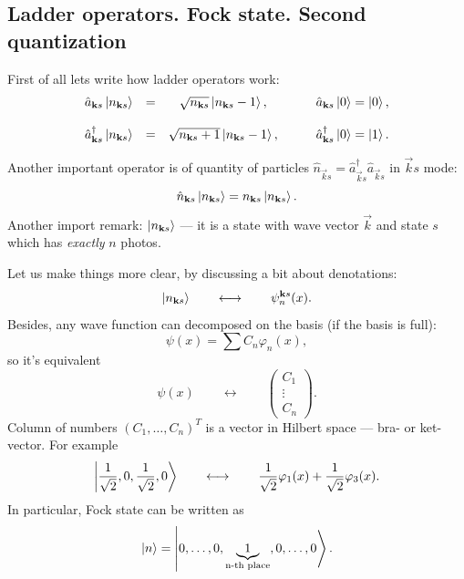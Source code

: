	
	\subsection{Ladder operators. Fock state. Second quantization}
	
	First of all lets write how ladder operators work:
	\begin{equation}
		\begin{matrix}
			\hat{a}_{\mathbf{k}s} \left\lvert {n_{\mathbf{k}s}} \right\rangle &=& \sqrt{n_{\mathbf{k}s}} \left\lvert {n_{\mathbf{k}s}-1} \right\rangle, & \quad & \hat{a}_{\mathbf{k}s} \left\lvert {0} \right\rangle = \left\lvert {0} \right\rangle, \\ \\
			\hat{a}^{\dagger}_{\mathbf{k}s} \left\lvert {n_{\mathbf{k}s}} \right\rangle &=& \sqrt{n_{\mathbf{k}s}+1} \left\lvert {n_{\mathbf{k}s}-1} \right\rangle, & \quad & \hat{a}^{\dagger}_{\mathbf{k}s} \left\lvert {0} \right\rangle = \left\lvert {1} \right\rangle.
		\end{matrix}
	\end{equation}
	
	Another important operator is of quantity of particles $\hat{n}_{\vec{k}s} = \hat{a}^{\dagger}_{\vec{k}s} \hat{a}_{\vec{k}s}$ in $\vec{k}s$ mode:
	\begin{equation}
		\hat{n}_{\mathbf{k}s} \left\lvert {n_{\mathbf{k}s}} \right\rangle = n_{\mathbf{k}s} \left\lvert {n_{\mathbf{k}s}} \right\rangle.
	\end{equation}
	Another import remark: $\left\lvert {n_{\mathbf{k}s}} \right\rangle$ --- it is a state with wave vector $\vec{k}$ and state $s$ which has \textit{exactly} $n$ photos.
	
	
	Let us make things more clear, by discussing a bit about denotations:
	\begin{equation}
		\left\lvert {n_{\mathbf{k}s}} \right\rangle \qquad \longleftrightarrow \qquad \psi_n^{\mathbf{k}s} (x).
	\end{equation}
	Besides, any wave function can decomposed
	on the basis (if the basis is full):
	\begin{equation}
		\psi(x) = \sum C_n \varphi_n(x),
	\end{equation}
	so it's equivalent
	\begin{equation}
		\psi(x) \qquad \longleftrightarrow \qquad \left( \begin{matrix}
			C_1 \\
			\vdots \\
			C_n
		\end{matrix} \right).
	\end{equation}
	Column of numbers $\left(C_1, \dots , C_n\right)^T$ is a vector in Hilbert space --- bra- or ket-vector. For example
	\begin{equation}
		\left\lvert {\frac{1}{\sqrt{2}},0,\frac{1}{\sqrt{2}},0} \right\rangle \qquad \longleftrightarrow \qquad \frac{1}{\sqrt{2}} \varphi_1(x) + \frac{1}{\sqrt{2}} \varphi_3(x).
	\end{equation}
	In particular, Fock state can be written as
	\begin{equation}
		\left\lvert {n} \right\rangle = \left\lvert {0, \dots, 0, \underbrace{1}_{\text{n-th place}}, 0, \dots , 0} \right\rangle.
	\end{equation}

